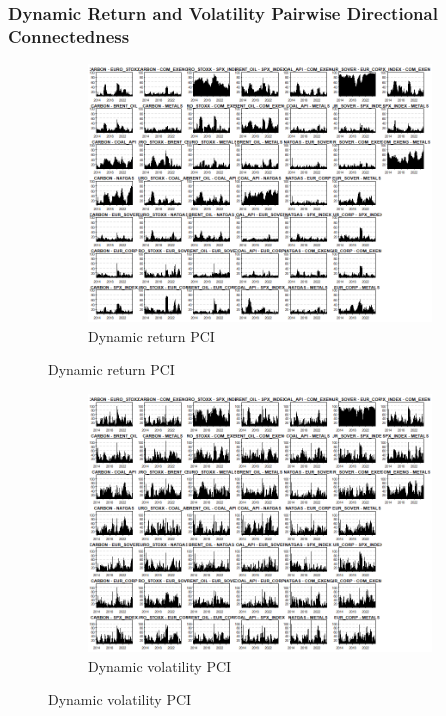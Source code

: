 \documentclass[preprint, 3p,
authoryear]{elsarticle} %
\begin{document}
\begin{landscape}
\newpage

\subsubsection{Dynamic Return and Volatility Pairwise Directional Connectedness}

\begin{figure}[!ht]
  \caption{Dynamic Return and Volatility Pairwise Connectedness Index (Jan 2013 – Jan 2025)}
  \centering
  \begin{subfigure}[a]{\textwidth}
    \caption{Dynamic return PCI}
    \includegraphics[width = 1.1\linewidth]{25aApdxD-12-180-RetPCI}
  \end{subfigure}
\end{figure}
\begin{figure}[!ht]
  \ContinuedFloat
  \centering
    \begin{subfigure}[b]{\textwidth}\ContinuedFloat
      \caption{Dynamic volatility PCI}
      \includegraphics[width = 1.2\linewidth]{25bApdxD-12-180-VolPCI}
    \end{subfigure}
\end{figure}











\end{landscape}
\end{document}
